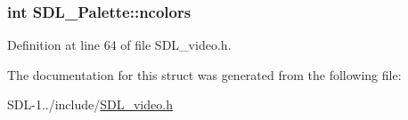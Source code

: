 \subsubsection[{ncolors}]{\setlength{\rightskip}{0pt plus 5cm}int S\+D\+L\+\_\+\+Palette\+::ncolors}\label{struct_s_d_l___palette_a81a0cc3197480e994c6b06f1f0567091}


Definition at line 64 of file S\+D\+L\+\_\+video.\+h.



The documentation for this struct was generated from the following file\+:\begin{DoxyCompactItemize}
\item 
S\+D\+L-\/1../include/\hyperlink{_s_d_l__video_8h}{S\+D\+L\+\_\+video.\+h}\end{DoxyCompactItemize}
